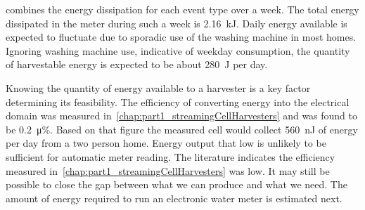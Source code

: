      combines the energy dissipation for each event type over a week.
    The total energy dissipated in the meter during such a week is \SI{2.16}{\kilo\joule}.
    Daily energy available is expected to fluctuate due to sporadic use of the washing machine in most homes.
    Ignoring washing machine use, indicative of weekday consumption, the quantity of harvestable energy is expected to be about \SI{280}{\joule} per day.

    Knowing the quantity of energy available to a harvester is a key factor determining its feasibility.
    The efficiency of converting energy into the electrical domain was measured in~\cref{chap:part1_streamingCellHarvesters} and was found to be \SI{0.2}{\micro\percent}.
    Based on that figure the measured cell would collect \SI{560}{\nano\joule} of energy per day from a two person home.
    Energy output that low is unlikely to be sufficient for automatic meter reading.
    The literature indicates the efficiency measured in~\cref{chap:part1_streamingCellHarvesters} was low.
    It may still be possible to close the gap between what we can produce and what we need.
    The amount of energy required to run an electronic water meter is estimated next.

